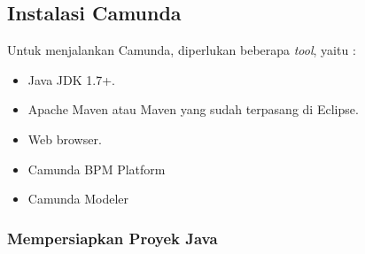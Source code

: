 \subsection{Instalasi Camunda}
\label{hasilstudi_bpms_instalasicamunda}
Untuk menjalankan Camunda, diperlukan beberapa \textit{tool}\cite{bpmngetstarted:15:camunda}, yaitu :
\begin{itemize}
	\item Java JDK 1.7+.
	\item Apache Maven atau Maven yang sudah terpasang di Eclipse.
	\item Web browser.
	\item Camunda BPM Platform 
	\item Camunda Modeler
\end{itemize}


\subsubsection{Mempersiapkan Proyek Java}
